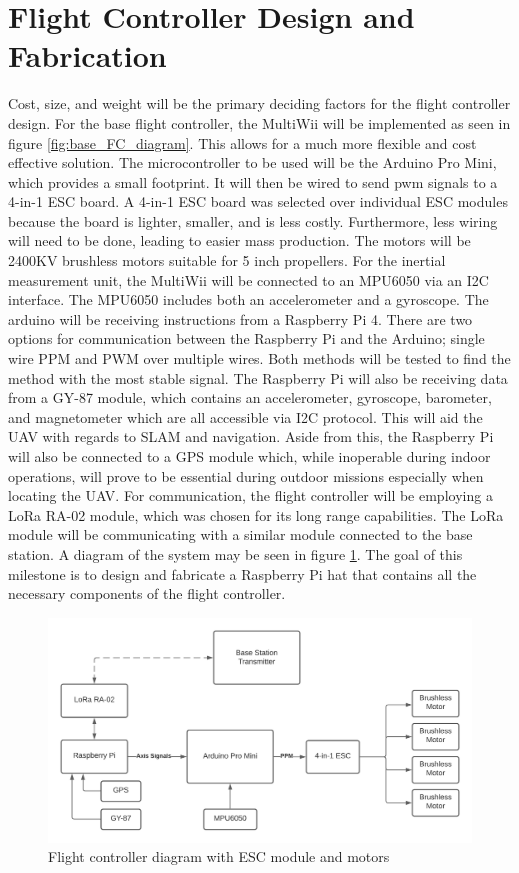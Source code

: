 \documentclass[english]{upeeei}
\begin{document}
\section{Flight Controller Design and Fabrication}
Cost, size, and weight will be the primary deciding factors for the flight controller design. For the base flight
controller, the MultiWii will be implemented as seen in figure \ref{fig:base_FC_diagram}. This allows for a much more flexible
and cost effective solution. The microcontroller to be used will be the Arduino Pro Mini, which provides a small
footprint. It will then be wired to send pwm signals to a 4-in-1 ESC board. A 4-in-1 ESC board was selected over
individual ESC modules because the board is lighter, smaller, and is less costly. Furthermore, less wiring will need to
be done, leading to easier mass production. The motors will be 2400KV brushless motors suitable for 5 inch propellers.
For the inertial measurement unit, the MultiWii will be connected to an MPU6050 via an I2C interface. The MPU6050 includes
both an accelerometer and a gyroscope. The arduino will be receiving instructions from a Raspberry Pi 4. There are two
options for communication between the Raspberry Pi and the Arduino; single wire PPM and PWM over multiple wires. Both
methods will be tested to find the method with the most stable signal. The Raspberry Pi will also be receiving data from
a GY-87 module, which contains an accelerometer, gyroscope, barometer, and magnetometer which are all accessible via
I2C protocol. This will aid the UAV with regards to SLAM and navigation. Aside from this, the Raspberry Pi will also be
connected to a GPS module which, while inoperable during indoor operations, will prove to be essential during outdoor
missions especially when locating the UAV. For communication, the flight controller will be employing a LoRa RA-02 module,
which was chosen for its long range capabilities. The LoRa module will be communicating with a similar module connected to
the base station. A diagram of the system may be seen in figure \ref{fig:final_FC_diagram}. The goal of this milestone is
to design and fabricate a Raspberry Pi hat that contains all the necessary components of the flight controller.
\begin{figure}[h]
    \centering
    \includegraphics[scale=0.5]{images/final_FC diagram.png}
    \caption{Flight controller diagram with ESC module and motors}
    \label{fig:final_FC_diagram}
\end{figure}
\end{document}
